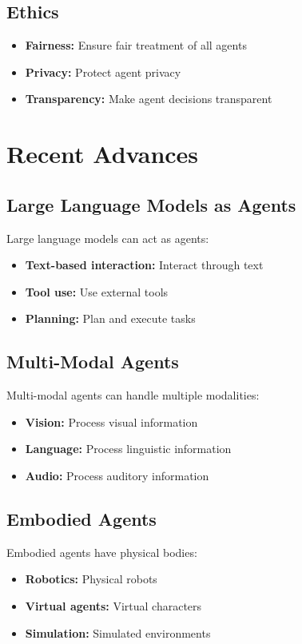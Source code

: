 \subsection{Ethics}

\begin{itemize}
    \item \textbf{Fairness:} Ensure fair treatment of all agents
    \item \textbf{Privacy:} Protect agent privacy
    \item \textbf{Transparency:} Make agent decisions transparent
\end{itemize}

\section{Recent Advances}

\subsection{Large Language Models as Agents}

Large language models can act as agents:
\begin{itemize}
    \item \textbf{Text-based interaction:} Interact through text
    \item \textbf{Tool use:} Use external tools
    \item \textbf{Planning:} Plan and execute tasks
\end{itemize}

\subsection{Multi-Modal Agents}

Multi-modal agents can handle multiple modalities:
\begin{itemize}
    \item \textbf{Vision:} Process visual information
    \item \textbf{Language:} Process linguistic information
    \item \textbf{Audio:} Process auditory information
\end{itemize}

\subsection{Embodied Agents}

Embodied agents have physical bodies:
\begin{itemize}
    \item \textbf{Robotics:} Physical robots
    \item \textbf{Virtual agents:} Virtual characters
    \item \textbf{Simulation:} Simulated environments
\end{itemize}


